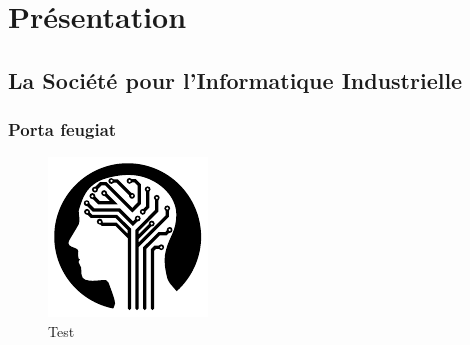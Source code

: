 \chapter{Présentation}
	\section{La Société pour l'Informatique Industrielle}
		\subsection{Porta feugiat}
		
			\lipsum[2]
			
			\begin{figure}[h]
				\centering
				\includegraphics[page=1,width=.3\textwidth]{figures/test.pdf}
				\caption{Test}
				\label{fig:Test}
			\end{figure}
			
			\lipsum[3]

